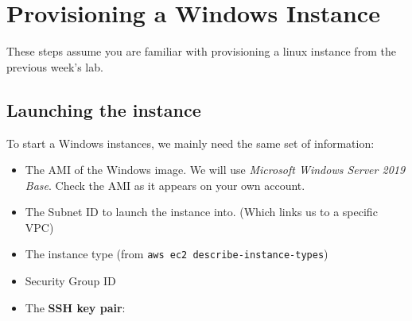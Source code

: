





\section{Provisioning a Windows
Instance}\label{provisioning-a-windows-instance}

These steps assume you are familiar with provisioning a linux instance
from the previous week's lab.

\subsection{Launching the instance}\label{launching-the-instance}

To start a Windows instances, we mainly need the same set of
information:

\begin{itemize}
\item
  The AMI of the Windows image. We will use \emph{Microsoft Windows
  Server 2019 Base}. Check the AMI as it appears on your own account.
\item
  The Subnet ID to launch the instance into. (Which links us to a specific VPC)
\item
  The instance type (from \texttt{aws\ ec2\ describe-instance-types})
\item
  Security Group ID
\item
  The \textbf{SSH key pair}:
\end{itemize}

